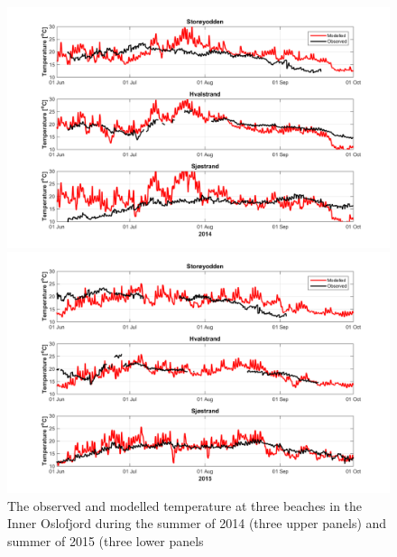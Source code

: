 \begin{figure}[htb]
	\centerline{ \includegraphics*[trim=0 0 0 0,clip=true,width=\textwidth]{Figurer/badetemp_2014} }
	\centerline{ \includegraphics*[trim=0 0 0 0,clip=true,width=\textwidth]{Figurer/badetemp_2015} }
	\caption{\small The observed and modelled temperature at three beaches in the Inner Oslofjord during the summer of 2014 (three upper panels) and summer of 2015 (three lower panels}
\label{fig:badetemp_2014}
\end{figure}

